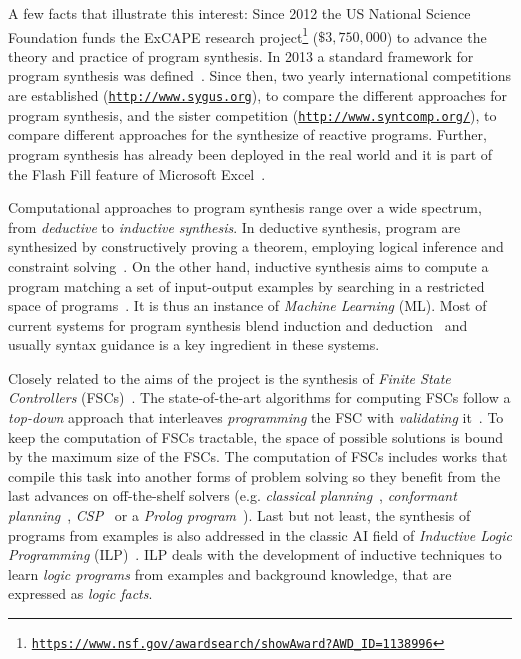 \documentclass[10pt,a4paper]{paper}
\begin{document}
A few facts that illustrate this interest: Since 2012 the {\sc US National Science Foundation} funds the ExCAPE research project\footnote{\tt\url{https://www.nsf.gov/awardsearch/showAward?AWD_ID=1138996}} ($\$3,750,000$) to advance the theory and practice of program synthesis. In 2013 a standard framework for program synthesis was defined~\cite{alur2013syntax}. Since then, two yearly international competitions are established ({\small\tt\url{http://www.sygus.org}}), to compare the different approaches for program synthesis, and the sister competition ({\small\tt\url{http://www.syntcomp.org/}}), to compare different approaches for the synthesize of reactive programs. Further, program synthesis has already been deployed in the real world and it is part of the {\sc Flash Fill} feature of {\sc Microsoft Excel}~\cite{gulwani2011automating}.

Computational approaches to program synthesis range over a wide spectrum, from {\em deductive} to {\em inductive synthesis}. In deductive synthesis, program are synthesized by constructively proving a theorem, employing logical inference and constraint solving~\cite{manna1986deductive}. On the other hand, inductive synthesis aims to compute a program matching a set of input-output examples by searching in a restricted space of programs~\cite{summers1977methodology,shapiro1983algorithmic}. It is thus an instance of {\em Machine Learning} (ML). Most of current systems for program synthesis blend induction and deduction~\cite{seshia2015combining} and usually syntax guidance is a key ingredient in these systems. 

Closely related to the aims of the project is the synthesis of {\it Finite State Controllers} (FSCs)~\cite{geffner:policies:IJCAI15}. The state-of-the-art algorithms for computing FSCs follow a {\it top-down} approach that interleaves {\it programming} the FSC with {\em validating} it~\cite{sergio:aprograming:ijcai16,segovia:FSC:JAIR2018}. To keep the computation of FSCs tractable, the space of possible solutions is bound by the maximum size of the FSCs. The computation of FSCs includes works that compile this task into another forms of problem solving so they benefit from the last advances on off-the-shelf solvers (e.g. {\em classical planning}~\cite{sergio:aprograming:icaps16}, {\em conformant planning}~\cite{Geffner:FSM:AAAI10}, {\em CSP}~\cite{Infantes:FSC:ECAI2010} or a {\em Prolog program}~\cite{Giacomo:FSM:ICAPS13}). Last but not least, the synthesis of programs from examples is also addressed in the classic AI field of {\em Inductive Logic Programming} (ILP)~\cite{muggleton1991inductive,Raedt:relationalML:book2008}. ILP deals with the development of inductive techniques to learn {\em logic programs} from examples and background knowledge, that are expressed as {\em logic facts}.
\end{document}
